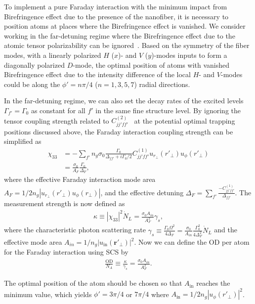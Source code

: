 \documentclass[pra,twocolumn,floatfix,superscriptaddress]{revtex4-1} %
\def\br{\mathbf{r}}
\begin{document}
To implement a pure Faraday interaction with the minimum impact from Birefringence effect due to the presence of the nanofiber, it is necessary to position atoms at places where the Birefringence effect is vanished. 
We consider working in the far-detuning regime where the Birefringence effect due to the atomic tensor polarizability can be ignored~\cite{Deutsch2010a}. 
Based on the symmetry of the fiber modes, with a linearly polarized $H$ ($x$)- and $V$ ($ y $)-modes inputs to form a diagonally polarized $ D $-mode, the optimal position of atoms with vanished Birefringence effect due to the intensity difference of the local $ H $- and $ V $-modes could be along the $ \phi'=n\pi/4 $ ($ n=1,3,5,7 $) radial directions. 

In the far-detuning regime, we can also set the decay rates of the excited levels $ \Gamma_{f'}= \Gamma_0$ as constant for all $ f' $ in the same fine structure level.
By ignoring the tensor coupling strength related to $ C_{jj'ff'}^{(2)} $~\cite{Deutsch2010a} at the potential optimal trapping positions discussed above, the Faraday interaction coupling strength can be simplified as
\begin{align}
\chi_{33} &= -\sum_{f'}n_g\sigma_0\frac{\Gamma_0}{\Delta_{ff'}+i\Gamma_0/2}C_{jj'ff'}^{(1)}u_{r\!_\perp}(r'\!_\perp)u_\phi(r'\!_\perp)\\
&=\frac{\sigma_0}{A_F}\frac{\Gamma_0}{\Delta_F},
\end{align}
where the effective Faraday interaction mode area $ A_F=1/2n_g|u_{r\!_\perp}(r'\!_\perp)u_\phi(r\!_\perp)| $, and the effective detuning $ \Delta_F=\sum_{f'}\frac{-C_{jj'ff'}^{(1)}}{\Delta_{ff'}} $.
The measurement strength is now defined as
\begin{align}
\kappa\equiv|\chi_{33}|^2\dot{N}_L=\frac{\sigma_0A_{in}}{A_F^2}\gamma_s,
\end{align}
where the characteristic photon scattering rate $ \gamma_s\equiv \frac{\Gamma_0\Omega^2}{4\Delta_F}=\frac{\sigma_0}{A_{in}}\frac{\Gamma_0^2}{4\Delta_F^2}\dot{N}_L $ and the effective mode area $ A_{in}=1/n_g|u_{\mathrm{in}}(\br'\!_\perp)|^2 $.
Now we can define the OD per atom for the Faraday interaction using SCS by
\begin{align}
\frac{\mathrm{OD}}{N_A} \equiv \frac{\kappa}{\gamma_s}=\frac{\sigma_0A_{in}}{A_F^2}.
\end{align}

The optimal position of the atom should be chosen so that $ A_{\mathrm{in}} $ reaches the minimum value, which yields $ \phi'=3\pi/4 $ or $ 7\pi/4 $ where $ A_{\mathrm{in}}=1/2n_g|u_\phi(r'\!_\perp)|^2 $.
\end{document}
